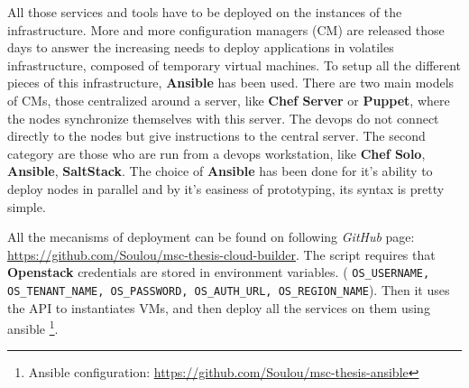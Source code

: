 All those services and tools have to be deployed on the instances of the
infrastructure.  More and more configuration managers (CM) are released those days to
answer the increasing needs to deploy applications in volatiles infrastructure,
composed of temporary virtual machines. To setup all the different pieces of
this infrastructure, \textbf{Ansible} has been used. There are two main models
of CMs, those centralized around a server, like \textbf{Chef Server} or \textbf{Puppet},
where the nodes synchronize themselves with this server. The devops do not connect
directly to the nodes but give instructions to the central server. The second
category are those who are run from a devops workstation, like \textbf{Chef Solo},
\textbf{Ansible}, \textbf{SaltStack}. The choice of \textbf{Ansible} has been done
for it's ability to deploy nodes in parallel and by it's easiness of prototyping,
its syntax is pretty simple.

All the mecanisms of deployment can be found on following \textit{GitHub} page:
\url{https://github.com/Soulou/msc-thesis-cloud-builder}. The script requires
that \textbf{Openstack} credentials are stored in environment variables. (
\texttt{OS\_USERNAME, OS\_TENANT\_NAME, OS\_PASSWORD, OS\_AUTH\_URL,
OS\_REGION\_NAME}). Then it uses the API to instantiates VMs, and then deploy
all the services on them using ansible \footnote{Ansible configuration:
\url{https://github.com/Soulou/msc-thesis-ansible}}.


